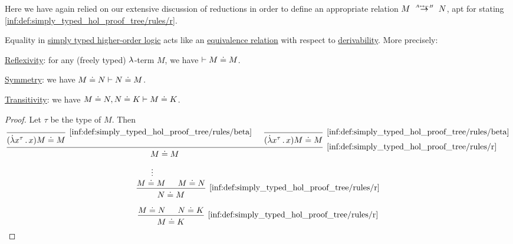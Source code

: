 \begin{comments}
  Here we have again relied on our extensive discussion of reductions in order to define an appropriate relation \( M \redrel{A \mapsto_\Gamma B} N \), apt for stating \ref{inf:def:simply_typed_hol_proof_tree/rules/r}.
\end{comments}

\begin{proposition}\label{thm:simply_typed_hol_equivalence}
  Equality in \hyperref[def:simply_typed_hol]{simply typed higher-order logic} acts like an \hyperref[def:equivalence_relation]{equivalence relation} with respect to \hyperref[def:simply_typed_hol_proof_tree]{derivability}. More precisely:

  \begin{thmenum}
     \hyperref[def:relation_closures/reflexive]{Reflexivity}: for any (freely typed) \( {\mathrm \lambda} \)-term \( M \), we have \( \vdash M \doteq M \).

     \hyperref[def:relation_closures/symmetric]{Symmetry}: we have \( M \doteq N \vdash N \doteq M \).

     \hyperref[def:relation_closures/transitive]{Transitivity}: we have \( M \doteq N, N \doteq K \vdash M \doteq K \).
  \end{thmenum}
\end{proposition}
\begin{proof}
   Let \( \tau \) be the type of \( M \). Then
  \begin{equation*}
    \begin{prooftree}
      \infer0[\ref{inf:def:simply_typed_hol_proof_tree/rules/beta}]{ (\qabs {x^\tau} x) M \syneq M }
      \infer0[\ref{inf:def:simply_typed_hol_proof_tree/rules/beta}]{ (\qabs {x^\tau} x) M \syneq M }
      \infer2[\ref{inf:def:simply_typed_hol_proof_tree/rules/r}]{ M \syneq M }
    \end{prooftree}
  \end{equation*}

  \begin{equation*}
    \begin{prooftree}
      \hypo{}
      \ellipsis {} { M \syneq M }

      \hypo{ M \syneq N }

      \infer2[\ref{inf:def:simply_typed_hol_proof_tree/rules/r}]{ N \syneq M }
    \end{prooftree}
  \end{equation*}

  \begin{equation*}
    \begin{prooftree}
      \hypo{ M \syneq N }
      \hypo{ N \syneq K }
      \infer2[\ref{inf:def:simply_typed_hol_proof_tree/rules/r}]{ M \syneq K }
    \end{prooftree}
  \end{equation*}
\end{proof}

